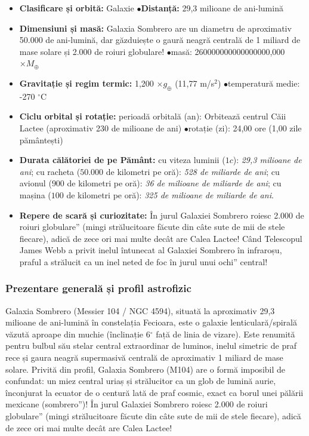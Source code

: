 \begin{tcolorbox}[orbitardata, title={\textbf{Repere esențiale: Galaxia Sombrero (M104)}}]
\small
\begin{itemize}[leftmargin=1.4em, itemsep=2pt, topsep=2pt]
  \item \textbf{Clasificare și orbită:} Galaxie \quad$\bullet$\quad \textbf{Distanță:} 29,3 milioane de ani-lumină
  \item \textbf{Dimensiuni și masă:} Galaxia Sombrero are un diametru de aproximativ 50.000 de ani-lumină, dar găzduiește o gaură neagră centrală de 1 miliard de mase solare și 2.000 de roiuri globulare! \quad$\bullet$\quad masă: 260000000000000000,000 $\times M_\oplus$
  \item \textbf{Gravitație și regim termic:} 1,200 $\times g_\oplus$ (11,77 m/s$^2$) \quad$\bullet$\quad temperatură medie: -270 $^\circ$C
  \item \textbf{Ciclu orbital și rotație:} perioadă orbitală (an): Orbitează centrul Căii Lactee (aproximativ 230 de milioane de ani) \quad$\bullet$\quad rotație (zi): 24,00 ore (1,00 zile pământești)
  \item \textbf{Durata călătoriei de pe Pământ:} cu viteza luminii ($1c$): \emph{29,3 milioane de ani}; cu racheta ($50.000$ de kilometri pe oră): \emph{528 de miliarde de ani}; cu avionul ($900$ de kilometri pe oră): \emph{36 de milioane de miliarde de ani}; cu mașina ($100$ de kilometri pe oră): \emph{325 de milioane de miliarde de ani}.
  \item \textbf{Repere de scară și curiozitate:} În jurul Galaxiei Sombrero roiesc 2.000 de \quotedblbase{}roiuri globulare\textquotedblright{} (mingi strălucitoare făcute din câte sute de mii de stele fiecare), adică de zece ori mai multe decât are Calea Lactee! Când Telescopul James Webb a privit inelul întunecat al Galaxiei Sombrero în infraroșu, praful a strălucit ca un inel neted de foc în jurul unui \quotedblbase{}ochi\textquotedblright{} central!
\end{itemize}
\end{tcolorbox}

\subsubsection*{Prezentare generală și profil astrofizic}
Galaxia Sombrero (Messier 104 / NGC 4594), situată la aproximativ 29,3 milioane de ani-lumină în constelația Fecioara, este o galaxie lenticulară/spirală văzută aproape din muchie (înclinație 6$^\circ$ față de linia de vizare). Este renumită pentru bulbul său stelar central extraordinar de luminos, inelul simetric de praf rece și gaura neagră supermasivă centrală de aproximativ 1 miliard de mase solare. Privită din profil, Galaxia Sombrero (M104) are o formă imposibil de confundat: un miez central uriaș și strălucitor ca un glob de lumină aurie, înconjurat la ecuator de o centură lată de praf cosmic, exact ca borul unei pălării mexicane (\quotedblbase{}sombrero\textquotedblright{})! În jurul Galaxiei Sombrero roiesc 2.000 de \quotedblbase{}roiuri globulare\textquotedblright{} (mingi strălucitoare făcute din câte sute de mii de stele fiecare), adică de zece ori mai multe decât are Calea Lactee!

